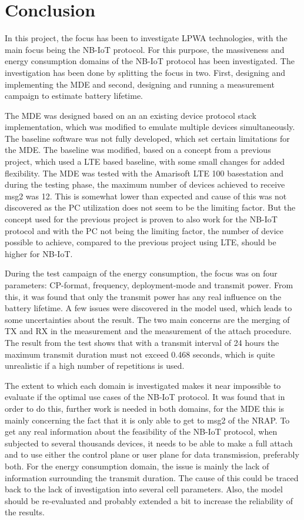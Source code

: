 \chapter{Conclusion}
\label{ch:con}
In this project, the focus has been to investigate LPWA technologies, with the main focus being the NB-IoT protocol. For this purpose, the massiveness and energy consumption domains of the NB-IoT protocol has been investigated. The investigation has been done by splitting the focus in two. First, designing and implementing the MDE and second, designing and running a measurement campaign to estimate battery lifetime. 

The MDE was designed based on an an existing device protocol stack implementation, which was modified to emulate multiple devices simultaneously. The baseline software was not fully developed, which set certain limitations for the MDE. The baseline was modified, based on a concept from a previous project, which used a LTE based baseline, with some small changes for added flexibility. The MDE was tested with the Amarisoft LTE 100 basestation and during the testing phase, the maximum number of devices achieved to receive msg2 was 12. This is somewhat lower than expected and cause of this was not discovered as the PC utilization does not seem to be the limiting factor. But the concept used for the previous project is proven to also work for the NB-IoT protocol and with the PC not being the limiting factor, the number of device possible to achieve, compared to the previous project using LTE, should be higher for NB-IoT.

During the test campaign of the energy consumption, the focus was on four parameters: CP-format, frequency, deployment-mode and transmit power. From this, it was found that only the transmit power has any real influence on the battery lifetime. A few issues were discovered in the model used, which leads to some uncertainties about the result. The two main concerns are the merging of TX and RX in the measurement and the measurement of the attach procedure. The result from the test shows that with a transmit interval of 24 hours the maximum transmit duration must not exceed 0.468 seconds, which is quite unrealistic if a high number of repetitions is used. 

The extent to which each domain is investigated makes it near impossible to evaluate if the optimal use cases of the NB-IoT protocol. It was found that in order to do this, further work is needed in both domains, for the MDE this is mainly concerning the fact that it is only able to get to msg2 of the NRAP. To get any real information about the feasibility of the NB-IoT protocol, when subjected to several thousands devices, it needs to be able to make a full attach and to use either the control plane or user plane for data transmission, preferably both. For the energy consumption domain, the issue is mainly the lack of information surrounding the transmit duration. The cause of this could be traced back to the lack of investigation into several cell parameters. Also, the model should be re-evaluated and probably extended a bit to increase the reliability of the results. 




